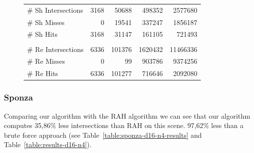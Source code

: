 \begin{figure}[!htb]
\begin{minipage}{0.725\linewidth}
\begin{tabular}[h]{l|rrrr}
            \hline
            \quad \# Sh Intersections   & 3168	    & 50688		& 498352	& 2577680	\\
            \quad \# Sh Misses          & 0		    & 19541		& 337247	& 1856187	\\
            \quad \# Sh Hits            & 3168		& 31147	    & 161105	& 721493	\\
            & & \\
            \quad \# Re Intersections   & 6336		& 101376	& 1620432	& 11466336	\\
            \quad \# Re Misses          & 0		    & 99	    & 903786	& 9374256	\\
            \quad \# Re Hits            & 6336		& 101277	& 716646	& 2092080	\\            
        \end{tabular}
        \label{table:cornell-d16-n4-results}
    \end{minipage}
\end{figure}

\subsubsection{Sponza}


Comparing our algorithm with the RAH algorithm we can see that our algorithm computes 35,86\% less intersections than RAH on this scene. 97,62\% less than a brute force approach (see Table~\ref{table:sponza-d16-n4-results} and Table~\ref{table:results-d16-n4}).


